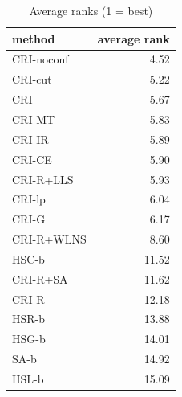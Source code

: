 \begin{table}[htbp]
\centering
\small
\caption{Average ranks (1 = best)}
\label{tab:E5_ablation_b10_ranks}
\begin{tabular}{lr}
\toprule
method & average rank \\
\midrule
CRI-noconf & 4.52 \\
CRI-cut & 5.22 \\
CRI & 5.67 \\
CRI-MT & 5.83 \\
CRI-IR & 5.89 \\
CRI-CE & 5.90 \\
CRI-R+LLS & 5.93 \\
CRI-lp & 6.04 \\
CRI-G & 6.17 \\
CRI-R+WLNS & 8.60 \\
HSC-b & 11.52 \\
CRI-R+SA & 11.62 \\
CRI-R & 12.18 \\
HSR-b & 13.88 \\
HSG-b & 14.01 \\
SA-b & 14.92 \\
HSL-b & 15.09 \\
\bottomrule
\end{tabular}
\end{table}
